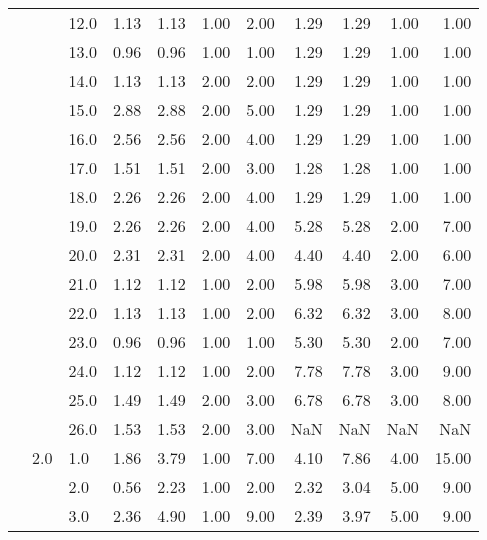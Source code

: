 \begin{tabular}{lllrrrrrrrr}
          &     & 12.0 &       1.13 &      1.13 &  1.00 &   2.00 &       1.29 &      1.29 &  1.00 &   1.00 \\
          &     & 13.0 &       0.96 &      0.96 &  1.00 &   1.00 &       1.29 &      1.29 &  1.00 &   1.00 \\
          &     & 14.0 &       1.13 &      1.13 &  2.00 &   2.00 &       1.29 &      1.29 &  1.00 &   1.00 \\
          &     & 15.0 &       2.88 &      2.88 &  2.00 &   5.00 &       1.29 &      1.29 &  1.00 &   1.00 \\
          &     & 16.0 &       2.56 &      2.56 &  2.00 &   4.00 &       1.29 &      1.29 &  1.00 &   1.00 \\
          &     & 17.0 &       1.51 &      1.51 &  2.00 &   3.00 &       1.28 &      1.28 &  1.00 &   1.00 \\
          &     & 18.0 &       2.26 &      2.26 &  2.00 &   4.00 &       1.29 &      1.29 &  1.00 &   1.00 \\
          &     & 19.0 &       2.26 &      2.26 &  2.00 &   4.00 &       5.28 &      5.28 &  2.00 &   7.00 \\
          &     & 20.0 &       2.31 &      2.31 &  2.00 &   4.00 &       4.40 &      4.40 &  2.00 &   6.00 \\
          &     & 21.0 &       1.12 &      1.12 &  1.00 &   2.00 &       5.98 &      5.98 &  3.00 &   7.00 \\
          &     & 22.0 &       1.13 &      1.13 &  1.00 &   2.00 &       6.32 &      6.32 &  3.00 &   8.00 \\
          &     & 23.0 &       0.96 &      0.96 &  1.00 &   1.00 &       5.30 &      5.30 &  2.00 &   7.00 \\
          &     & 24.0 &       1.12 &      1.12 &  1.00 &   2.00 &       7.78 &      7.78 &  3.00 &   9.00 \\
          &     & 25.0 &       1.49 &      1.49 &  2.00 &   3.00 &       6.78 &      6.78 &  3.00 &   8.00 \\
          &     & 26.0 &       1.53 &      1.53 &  2.00 &   3.00 &        NaN &       NaN &   NaN &    NaN \\
          & 2.0 & 1.0  &       1.86 &      3.79 &  1.00 &   7.00 &       4.10 &      7.86 &  4.00 &  15.00 \\
          &     & 2.0  &       0.56 &      2.23 &  1.00 &   2.00 &       2.32 &      3.04 &  5.00 &   9.00 \\
          &     & 3.0  &       2.36 &      4.90 &  1.00 &   9.00 &       2.39 &      3.97 &  5.00 &   9.00 \\

\end{tabular}
